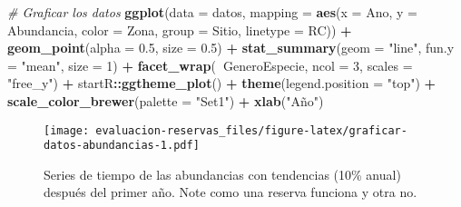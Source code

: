 \documentclass[]{krantz}
\newenvironment{Shaded}{\begin{snugshade}}{\end{snugshade}}
\newcommand{\CommentTok}[1]{\textcolor[rgb]{0.56,0.35,0.01}{\textit{#1}}}
\newcommand{\DataTypeTok}[1]{\textcolor[rgb]{0.13,0.29,0.53}{#1}}
\newcommand{\DecValTok}[1]{\textcolor[rgb]{0.00,0.00,0.81}{#1}}
\newcommand{\FloatTok}[1]{\textcolor[rgb]{0.00,0.00,0.81}{#1}}
\newcommand{\KeywordTok}[1]{\textcolor[rgb]{0.13,0.29,0.53}{\textbf{#1}}}
\newcommand{\NormalTok}[1]{#1}
\newcommand{\OperatorTok}[1]{\textcolor[rgb]{0.81,0.36,0.00}{\textbf{#1}}}
\newcommand{\StringTok}[1]{\textcolor[rgb]{0.31,0.60,0.02}{#1}}
\begin{document}
\begin{Shaded}
\begin{Highlighting}[]
\CommentTok{# Graficar los datos}
\KeywordTok{ggplot}\NormalTok{(}\DataTypeTok{data =}\NormalTok{ datos,}
       \DataTypeTok{mapping =} \KeywordTok{aes}\NormalTok{(}\DataTypeTok{x =}\NormalTok{ Ano, }\DataTypeTok{y =}\NormalTok{ Abundancia,}
                     \DataTypeTok{color =}\NormalTok{ Zona, }\DataTypeTok{group =}\NormalTok{ Sitio, }\DataTypeTok{linetype =}\NormalTok{ RC)) }\OperatorTok{+}
\StringTok{  }\KeywordTok{geom_point}\NormalTok{(}\DataTypeTok{alpha =} \FloatTok{0.5}\NormalTok{, }\DataTypeTok{size =} \FloatTok{0.5}\NormalTok{) }\OperatorTok{+}
\StringTok{  }\KeywordTok{stat_summary}\NormalTok{(}\DataTypeTok{geom =} \StringTok{"line"}\NormalTok{, }\DataTypeTok{fun.y =} \StringTok{"mean"}\NormalTok{, }\DataTypeTok{size =} \DecValTok{1}\NormalTok{) }\OperatorTok{+}
\StringTok{  }\KeywordTok{facet_wrap}\NormalTok{(}\OperatorTok{~}\NormalTok{GeneroEspecie, }\DataTypeTok{ncol =} \DecValTok{3}\NormalTok{, }\DataTypeTok{scales =} \StringTok{"free_y"}\NormalTok{) }\OperatorTok{+}
\StringTok{  }\NormalTok{startR}\OperatorTok{::}\KeywordTok{ggtheme_plot}\NormalTok{() }\OperatorTok{+}
\StringTok{  }\KeywordTok{theme}\NormalTok{(}\DataTypeTok{legend.position =} \StringTok{"top"}\NormalTok{) }\OperatorTok{+}
\StringTok{  }\KeywordTok{scale_color_brewer}\NormalTok{(}\DataTypeTok{palette =} \StringTok{"Set1"}\NormalTok{) }\OperatorTok{+}
\StringTok{  }\KeywordTok{xlab}\NormalTok{(}\StringTok{"Año"}\NormalTok{)}
\end{Highlighting}
\end{Shaded}

\begin{figure}
\centering
\texttt{[image: evaluacion-reservas\_files/figure-latex/graficar-datos-abundancias-1.pdf]}
\caption{\label{fig:graficar-datos-abundancias}Series de tiempo de las
abundancias con tendencias (10\% anual) después del primer año. Note
como una reserva funciona y otra no.}
\end{figure}
\end{document}
